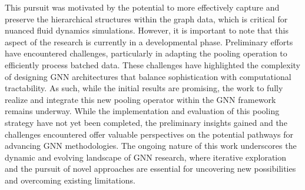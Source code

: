 This pursuit was motivated by the potential to more effectively capture and preserve the hierarchical structures within the graph data, which is critical for nuanced fluid dynamics simulations. However, it is important to note that this aspect of the research is currently in a developmental phase. Preliminary efforts have encountered challenges, particularly in adapting the pooling operation to efficiently process batched data. These challenges have highlighted the complexity of designing GNN architectures that balance sophistication with computational tractability. As such, while the initial results are promising, the work to fully realize and integrate this new pooling operator within the GNN framework remains underway. While the implementation and evaluation of this pooling strategy have not yet been completed, the preliminary insights gained and the challenges encountered offer valuable perspectives on the potential pathways for advancing GNN methodologies. The ongoing nature of this work underscores the dynamic and evolving landscape of GNN research, where iterative exploration and the pursuit of novel approaches are essential for uncovering new possibilities and overcoming existing limitations.

